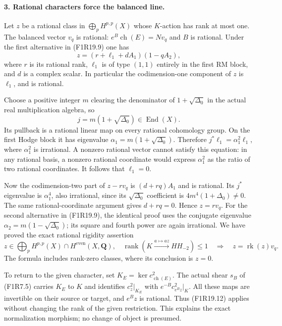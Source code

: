 \paragraph{3. Rational characters force the balanced line.}
Let $z$ be a rational class in
$\bigoplus_p H^{p,p}(X)$ whose $K$-action has rank
at most one. The balanced vector $v_q$ is rational:
$e^B\operatorname{ch}(E)=Nv_q$ and $B$ is rational.
Under the first alternative in (F1R19.9) one has
\[
       z=(r+\ell_1+dA_1)(1-qA_2),
 \tag{F1R19.10}
\]
where $r$ is its rational rank, $\ell_1$ is of type
$(1,1)$ entirely in the first RM block, and $d$ is
a complex scalar. In particular the codimension-one
component of $z$ is $\ell_1$, and is rational.

Choose a positive integer $m$ clearing the denominator
of $1+\sqrt{\Delta_0}$ in the actual real multiplication
algebra, so
\[
               j=m(1+\sqrt{\Delta_0})\in\operatorname{End}(X).
 \tag{F1R19.11}
\]
Its pullback is a rational linear map on every rational
cohomology group. On the first Hodge block it has
eigenvalue $\alpha_1=m(1+\sqrt{\Delta_0})$.
Therefore $j^*\ell_1=\alpha_1^2\ell_1$, where
$\alpha_1^2$ is irrational. A nonzero rational vector
cannot satisfy this equation: in any rational basis,
a nonzero rational coordinate would express
$\alpha_1^2$ as the ratio of two rational coordinates.
It follows that $\ell_1=0$.

Now the codimension-two part of $z-rv_q$ is
$(d+rq)A_1$ and is rational. Its $j^*$ eigenvalue is
$\alpha_1^4$, also irrational, since its
$\sqrt{\Delta_0}$ coefficient is
$4m^4(1+\Delta_0)\ne0$. The same rational-coordinate
argument gives $d+rq=0$. Hence $z=rv_q$.
For the second alternative in (F1R19.9), the identical
proof uses the conjugate eigenvalue
$\alpha_2=m(1-\sqrt{\Delta_0})$; its square and fourth
power are again irrational. We have proved the exact
rational rigidity assertion
\[
 z\in\bigoplus_p H^{p,p}(X)\cap H^{\mathrm{even}}(X,\mathbf Q),
 \quad\operatorname{rank}(K\xrightarrow{a\mapsto az}HH_{-2})\le1
       \quad\Longrightarrow\quad z=\operatorname{rk}(z)v_q.
 \tag{F1R19.12}
\]
The formula includes rank-zero classes, where its
conclusion is $z=0$.

To return to the given character, set
$K_E=\ker c^2_{\operatorname{ch}(E)}$.
The actual shear $s_B$ of (F1R7.5) carries $K_E$ to
$K$ and identifies $c_z^2|_{K_E}$ with
$e^{-B}c_{e^Bz}^2|_K$. All these maps are invertible
on their source or target, and $e^Bz$ is rational.
Thus (F1R19.12) applies without changing the rank of
the given restriction. This explains the exact
normalization morphism; no change of object is presumed.

